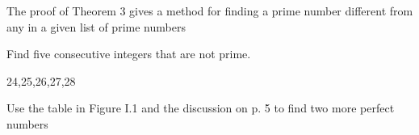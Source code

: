 \documentclass[addpoints,12pt]{exam}
\begin{document}
\begin{questions}

\question 
The proof of Theorem 3 gives a method for finding a prime number different from any in a given list of prime numbers

\question
Find five consecutive integers that are not prime.

    24,25,26,27,28

\question Use the table in Figure I.1 and the discussion on p. 5 to find two more
perfect numbers
    \begin{parts}

\end{parts}
\end{questions}
\end{document}
